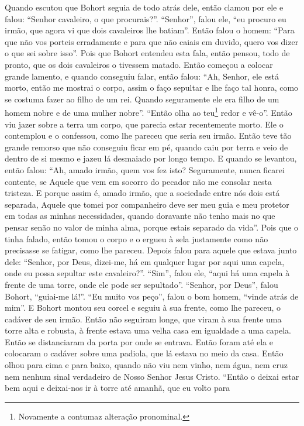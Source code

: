 Quando escutou que Bohort seguia de todo atrás dele, então clamou por ele e
falou: “Senhor cavaleiro, o que procurais?”. “Senhor”, falou ele, “eu procuro
eu irmão, que agora vi que dois cavaleiros lhe batiam”. Então falou o homem:
“Para que não vos porteis erradamente e para que não caiais em duvido, quero
vos dizer o que sei sobre isso”. Pois que Bohort entendeu esta fala, então
pensou, todo de pronto, que os dois cavaleiros o tivessem matado. Então começou
a colocar grande lamento, e quando conseguiu falar, então falou: “Ah, Senhor,
ele está morto, então me mostrai o corpo, assim o faço sepultar e lhe faço tal
honra, como se costuma fazer ao filho de um rei. Quando seguramente ele era
filho de um homem nobre e de uma mulher nobre”. “Então olha ao
teu\footnote{ Novamente a contumaz alteração pronominal.}  redor e
vê-o”. Então viu jazer sobre a terra um corpo, que parecia estar recentemente
morto. Ele o contemplou e o confessou, como lhe pareceu que seria seu irmão.
Então teve tão grande remorso que não conseguiu ficar em pé, quando caiu por
terra e veio de dentro de si mesmo e jazeu lá desmaiado por longo tempo. E
quando se levantou, então falou: “Ah, amado irmão, quem vos fez isto?
Seguramente, nunca ficarei contente, se Aquele que vem em socorro do pecador
não me consolar nesta tristeza. E porque assim é, amado irmão, que a sociedade
entre nós dois está separada, Aquele que tomei por companheiro deve ser meu
guia e meu protetor em todas as minhas necessidades, quando doravante não tenho
mais no que pensar senão no valor de minha alma, porque estais separado da
vida”. Pois que o tinha falado, então tomou o corpo e o ergueu à sela
justamente como não precisasse se fatigar, como lhe pareceu. Depois falou para
aquele que estava junto dele: “Senhor, por Deus, dizei-me, há em qualquer lugar
por aqui uma capela, onde eu possa sepultar este cavaleiro?”. “Sim”, falou ele,
“aqui há uma capela à frente de uma torre, onde ele pode ser sepultado”.
“Senhor, por Deus”, falou Bohort, “guiai-me lá!”. “Eu muito vos peço”, falou o
bom homem, “vinde atrás de mim”. E Bohort montou seu corcel e seguiu à sua
frente, como lhe pareceu, o cadáver de seu irmão. Então não seguiram longe, que
viram à sua frente uma torre alta e robusta, à frente estava uma velha casa em
igualdade a uma capela. Então se distanciaram da porta por onde se entrava.
Então foram até ela e colocaram o cadáver sobre uma padiola, que lá estava no
meio da casa. Então olhou para cima e para baixo, quando não viu nem vinho, nem
água, nem cruz nem nenhum sinal verdadeiro de Nosso Senhor Jesus Cristo. “Então
o deixai estar bem aqui e deixai-nos ir à torre até amanhã, que eu volto para
